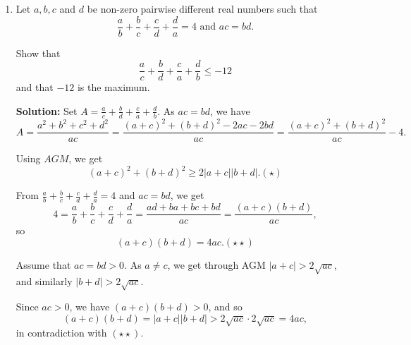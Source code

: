 \documentclass{article}
\newcommand{\solution}[1]{%
\ifsolutions%
    \textbf{Solution: } #1
\fi
}
\begin{document}
\begin{enumerate}
\solution{Let $a_i$ and $b_i$ denote the width and height of each white rectangle, and $c_i$ and $d_i$ denote the width and height of each red rectangle. Also, let $\ell$ denote the side length of the original square. We claim that, either $\sum a_i \geq \ell$ or $\sum d_i \geq l$. We prove this as follows: \textit{suppose there exists a horizontal line across the square that is covered entirely with white rectangles. Then, the total width of these rectangles is at least $\ell$, and the claim is proven. Otherwise, there is a red rectangle intersecting every horizontal line, and hence the total height of these rectangles is at least $\ell$.} Without loss of generality, assume $\sum a_i \geq \ell$. By the Cauchy-Schwarz inequality, $\sum \frac{a_i}{b_i} \sum{a_i b_i} \geq {(\sum a_i)}^2 \geq \ell^2$. The total area of the white rectangles is half of that of the square, so $\sum a_i b_i = \frac{1}{2} \ell^2$, and so $\sum \frac{a_i}{b_i} \geq 2$. Furthermore, each $x_i \leq \ell$, so $\sum{d_i}{c_i} \geq \frac{1}{\ell} \sum d_i \geq \frac{1}{\ell^2} \sum c_i d_i = \frac{1}{2}$. Therefore, $x$ is at least $2.5$. Conversely, $x = 2.5$ can be achieved by making the top half of the square one colour, and the bottom half the other colour.}

\item Let $a, b, c$ and $d$ be non-zero pairwise different real numbers such that 
\[
    \frac{a}{b} + \frac{b}{c} + \frac{c}{d} + \frac{d}{a} = 4 \text{ and } ac = bd.
\]

Show that
\[
    \frac{a}{c} + \frac{b}{d} + \frac{c}{a} + \frac{d}{b} \leq -12
\]
and that $-12$ is the maximum.

\solution{Set $A = \frac{a}{c} + \frac{b}{d} + \frac{c}{a} + \frac{d}{b}$. As $ac = bd$, we have
\[
    A = \frac{a^2 + b^2 + c^2 + d^2}{ac} = \frac{{(a + c)}^2 + {(b + d)}^2 - 2ac - 2bd}{ac} = \frac{{(a + c)}^2 + {(b + d)}^2}{ac} - 4.
\]

Using $AGM$, we get
\[
    {(a + c)}^2 + {(b + d)}^2 \geq 2 |a + c| |b + d|. (\star)
\]

From $\frac{a}{b} + \frac{b}{c} + \frac{c}{d} + \frac{d}{a} = 4$ and $ac = bd$, we get
\[
    4 = \frac{a}{b} + \frac{b}{c} + \frac{c}{d} + \frac{d}{a} = \frac{ad + ba + bc + bd}{ac} = \frac{(a + c)(b + d)}{ac},
\]
so
\[
    (a + c)(b + d) = 4ac. (\star \star)
\]

Assume that $ac = bd > 0$. As $a \neq c$, we get through AGM $|a + c| > 2 \sqrt{ac}$, and similarly $|b + d| > 2 \sqrt{ac}$.

Since $ac > 0$, we have $(a + c)(b + d) > 0$, and so
\[
    (a + c)(b + d) = |a + c| |b + d| > 2 \sqrt{ac} \cdot 2 \sqrt{ac} = 4ac,
\]
in contradiction with $(\star \star)$.

}
\end{enumerate}
\end{document}
